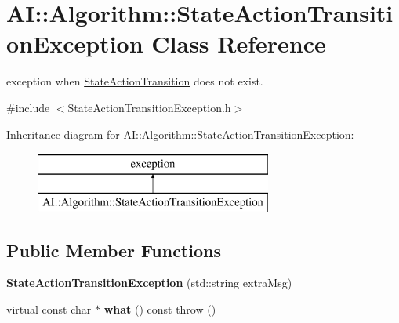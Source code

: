 \hypertarget{classAI_1_1Algorithm_1_1StateActionTransitionException}{\section{A\-I\-:\-:Algorithm\-:\-:State\-Action\-Transition\-Exception Class Reference}
\label{classAI_1_1Algorithm_1_1StateActionTransitionException}
}


exception when \hyperlink{classAI_1_1Algorithm_1_1StateActionTransition}{State\-Action\-Transition} does not exist.  




{\ttfamily \#include $<$State\-Action\-Transition\-Exception.\-h$>$}

Inheritance diagram for A\-I\-:\-:Algorithm\-:\-:State\-Action\-Transition\-Exception\-:\begin{figure}[H]
\begin{center}
\leavevmode
\includegraphics[height=2.000000cm]{classAI_1_1Algorithm_1_1StateActionTransitionException}
\end{center}
\end{figure}
\subsection*{Public Member Functions}
\begin{DoxyCompactItemize}
\item 
\hypertarget{classAI_1_1Algorithm_1_1StateActionTransitionException_a7b8bf70b19728f4b6616ae726c88fc54}{{\bfseries State\-Action\-Transition\-Exception} (std\-::string extra\-Msg)}\label{classAI_1_1Algorithm_1_1StateActionTransitionException_a7b8bf70b19728f4b6616ae726c88fc54}

\item 
\hypertarget{classAI_1_1Algorithm_1_1StateActionTransitionException_a3af53ac148abbcfd435a8da87cc92e29}{virtual const char $\ast$ {\bfseries what} () const   throw ()}\label{classAI_1_1Algorithm_1_1StateActionTransitionException_a3af53ac148abbcfd435a8da87cc92e29}

\end{DoxyCompactItemize}


